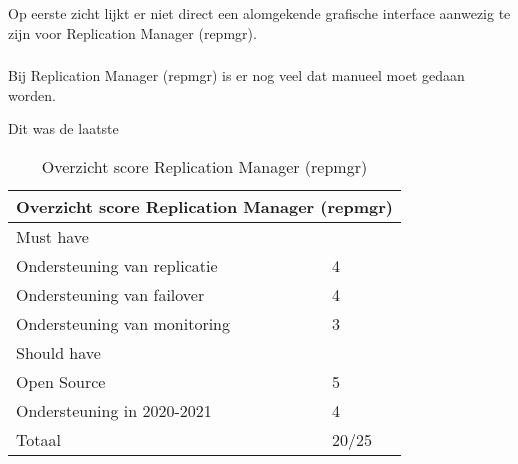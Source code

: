 Op eerste zicht lijkt er niet direct een alomgekende grafische interface aanwezig te zijn voor Replication Manager (repmgr).

\subsubsection{}
\label{subsubsec:Beperkte manuele interventie}

Bij Replication Manager (repmgr) is er nog veel dat manueel moet gedaan worden.


Dit was de laatste

\begin{table}[!h]
    \centering
    \begin{tabular}{ |p{6cm}||p{6cm}|  }
        \hline
        \multicolumn{2}{|c|}{Overzicht score Replication Manager (repmgr)} \\
        \hline
        Must have & \\
        \hline
        Ondersteuning van replicatie  & 4 \\
        Ondersteuning van failover &  4 \\
        Ondersteuning van monitoring & 3 \\
        \hline
        Should have & \\
        \hline
        Open Source &  5 \\
        Ondersteuning in 2020-2021 & 4 \\
        \hline
        \hline
        Totaal & 20/25 \\
        \hline
    \end{tabular}
    \caption{Overzicht score Replication Manager (repmgr)}
    \label{table:Overzicht score Replication Manager (repmgr)}
\end{table}